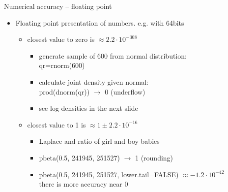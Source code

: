 \documentclass[finnish,english,t]{beamer}
\begin{document}
\begin{frame}{Numerical accuracy -- floating point}

  \begin{itemize}
  \item Floating point presentation of numbers. e.g. with 64bits
    \begin{itemize}
    \item closest value to zero is $\approx 2.2\cdot 10^{-308}$
      \begin{itemize}
      \item generate sample of 600 from normal distribution:\\
        {\color{navyblue} qr=rnorm(600)}
      \item calculate joint density given normal:\\
        {\color{navyblue} prod(dnorm(qr)) $\rightarrow$} {\color{red} 0 (underflow)}
      \item<2-> see log densities in the next slide
      \end{itemize}
    \item<3-> closest value to 1 is $\approx 1 \pm  2.2\cdot 10^{-16}$
      \begin{itemize}
      \item<3-> Laplace and ratio of girl and boy babies 
      \item<3-> {\color{navyblue}  pbeta(0.5, 241945, 251527) $\rightarrow$} {\color{red}  1 (rounding)}
      \item<4-> {\color{navyblue} pbeta(0.5, 241945, 251527, lower.tail=FALSE) $\approx -1.2\cdot 10^{-42}$}\\
        there is more accuracy near 0
      \end{itemize}
    \end{itemize}
  \end{itemize}

\end{frame}
\end{document}
